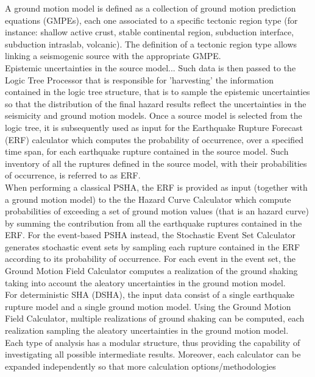 A ground motion model is defined as a collection of ground motion prediction 
equations (GMPEs), each one associated to a specific tectonic region type (for 
instance: shallow active crust, stable continental region, subduction interface,
subduction intraslab, volcanic). The definition of a tectonic region type allows
linking a seismogenic source with the appropriate GMPE.\\
Epistemic uncertainties in the source model...
Such data is then passed to the Logic Tree Processor that is responsible for 
'harvesting' the information contained in the logic tree structure, that is
to sample the epistemic uncertainties so that the distribution of the final 
hazard results reflect the uncertainties in the seismicity and ground motion
models. Once a source model is selected from the logic tree, it is subsequently 
used as input for the Earthquake Rupture Forecast (ERF) calculator which 
computes the probability of occurrence, over a specified time span, for each 
earthquake rupture contained in the source model. Such inventory of all the 
ruptures defined in the source model, with their probabilities of occurrence, 
is referred to as ERF.\\
When performing a classical PSHA, the ERF is provided as input (together with 
a ground motion model) to the the Hazard Curve Calculator which compute 
probabilities of exceeding a set of ground motion values (that is an hazard
curve) by summing the contribution from all the earthquake ruptures contained
in the ERF. For the event-based PSHA instead, the Stochastic Event Set 
Calculator generates stochastic event sets by sampling each rupture contained 
in the ERF according to its probability of occurrence. For each event in the 
event set, the Ground Motion Field Calculator computes a realization of the 
ground shaking taking into account the aleatory uncertainties in the ground 
motion model.\\
For deterministic SHA (DSHA), the input data consist of a single earthquake 
rupture model and a single ground motion model. Using the Ground Motion Field 
Calculator, multiple realizations of ground shaking can be computed, each 
realization sampling the aleatory uncertainties in the ground motion model.\\
Each type of analysis has a modular structure, thus providing the capability 
of investigating all possible intermediate results. Moreover, each calculator 
can be expanded independently so that more calculation options/methodologies 
